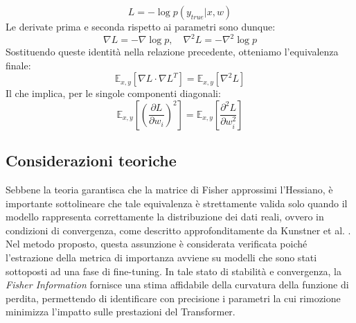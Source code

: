\begin{equation}
    L = -\log p(y_{true}|x,w)
\end{equation}
Le derivate prima e seconda rispetto ai parametri sono dunque:
\begin{equation}\nabla L = -\nabla \log p, \quad \nabla^2 L = -\nabla^2 \log p
\end{equation}
Sostituendo queste identità nella relazione precedente, otteniamo l'equivalenza finale:
\begin{equation}
    \mathbb{E}_{x,y} \left[ \nabla L \cdot \nabla L^T \right] = \mathbb{E}_{x,y} \left[ \nabla^2 L \right]\end{equation}
Il che implica, per le singole componenti diagonali:
\begin{equation}
    \mathbb{E}_{x,y} \left[ \left( \frac{\partial L}{\partial w_i} \right)^2 \right] = \mathbb{E}_{x,y} \left[ \frac{\partial^2 L}{\partial w_i^2} \right]
\end{equation}
\subsection*{Considerazioni teoriche}
Sebbene la teoria garantisca che la matrice di Fisher approssimi l'Hessiano, è
importante sottolineare che tale equivalenza è strettamente valida solo quando
il modello rappresenta correttamente la distribuzione dei dati reali, ovvero in
condizioni di convergenza, come descritto approfonditamente da Kunstner et al.
\cite{kunstner2020limitationsempiricalfisherapproximation}. Nel metodo
proposto, questa assunzione è considerata verificata poiché l'estrazione della
metrica di importanza avviene su modelli che sono stati sottoposti ad una fase
di fine-tuning. In tale stato di stabilità e convergenza, la \textit{Fisher
    Information} fornisce una stima affidabile della curvatura della funzione di
perdita, permettendo di identificare con precisione i parametri la cui
rimozione minimizza l'impatto sulle prestazioni del Transformer.
